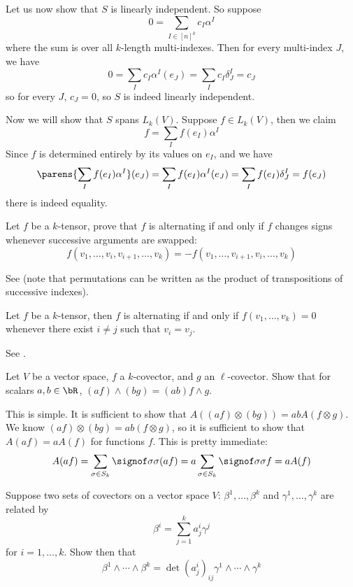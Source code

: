 \documentclass[10pt]{article}
\begin{document}
Let us now show that $S$ is linearly independent.
So suppose
\[ 0 = \sum_{I\in[n]^k}c_I\alpha^I \]
where the sum is over all $k$-length multi-indexes.
Then for every multi-index $J$, we have
\[ 0 = \sum_Ic_I\alpha^I(e_J) = \sum_I c_I\delta^I_J = c_J \]
so for every $J$, $c_J=0$, so $S$ is indeed linearly independent.

Now we will show that $S$ spans $L_k(V)$.
Suppose $f\in L_k(V)$, then we claim
\[ f = \sum_I f(e_I)\alpha^I \]
Since $f$ is determined entirely by its values on $e_I$, and we have
\[ \parens{\sum_I f(e_I)\alpha^I}(e_J) = \sum_I f(e_I)\alpha^I(e_J) = \sum_I f(e_I)\delta^I_J = f(e_J) \]
there is indeed equality.

\begin{exercise*}

    Let $f$ be a $k$-tensor, prove that $f$ is alternating if and only if $f$ changes signs whenever successive arguments are swapped:
    \[ f(v_1,\dots,v_i,v_{i+1},\dots,v_k) = -f(v_1,\dots,v_{i+1},v_i,\dots,v_k) \]

\end{exercise*}

See  (note that permutations can be written as the product of transpositions of successive indexes).

\begin{exercise*}

    Let $f$ be a $k$-tensor, then $f$ is alternating if and only if $f(v_1,\dots,v_k)=0$ whenever there exist $i\neq j$ such that $v_i=v_j$.

\end{exercise*}

See .

\begin{exercise*}

    Let $V$ be a vector space, $f$ a $k$-covector, and $g$ an $\ell$-covector.
    Show that for scalars $a,b\in\bR$, $(af)\wedge(bg)=(ab)f\wedge g$.

\end{exercise*}

This is simple.
It is sufficient to show that $A((af)\otimes(bg))=abA(f\otimes g)$.
We know $(af)\otimes(bg)=ab(f\otimes g)$, so it is sufficient to show that $A(af)=aA(f)$ for functions $f$.
This is pretty immediate:
\[ A(af) = \sum_{\sigma\in S_k}\signof\sigma\sigma(af) = a\sum_{\sigma\in S_k}\signof\sigma\sigma f = aA(f) \]

\begin{exercise*}

    Suppose two sets of covectors on a vector space $V$: $\beta^1,\dots,\beta^k$ and $\gamma^1,\dots,\gamma^k$ are related by
    \[ \beta^i = \sum_{j=1}^k a^i_j\gamma^j \]
    for $i=1,\dots,k$.
    Show then that
    \[ \beta^1\wedge\cdots\wedge\beta^k = \det(a^i_j)_{ij}\gamma^1\wedge\cdots\wedge\gamma^k \]

\end{exercise*}
\end{document}
